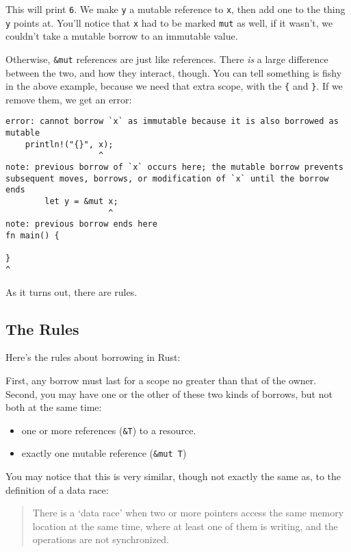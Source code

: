 \documentclass[a4paper,]{book}
\providecommand{\tightlist}{%
  \setlength{\itemsep}{0pt}\setlength{\parskip}{0pt}}
\begin{document}
This will print \texttt{6}. We make \texttt{y} a mutable reference to
\texttt{x}, then add one to the thing \texttt{y} points at. You'll
notice that \texttt{x} had to be marked \texttt{mut} as well, if it
wasn't, we couldn't take a mutable borrow to an immutable value.

Otherwise, \texttt{\&mut} references are just like references. There
\emph{is} a large difference between the two, and how they interact,
though. You can tell something is fishy in the above example, because we
need that extra scope, with the \texttt{\{} and \texttt{\}}. If we
remove them, we get an error:

\begin{verbatim}
error: cannot borrow `x` as immutable because it is also borrowed as mutable
    println!("{}", x);
                   ^
note: previous borrow of `x` occurs here; the mutable borrow prevents
subsequent moves, borrows, or modification of `x` until the borrow ends
        let y = &mut x;
                     ^
note: previous borrow ends here
fn main() {

}
^
\end{verbatim}

As it turns out, there are rules.

\subsection{The Rules}\label{the-rules}

Here's the rules about borrowing in Rust:

First, any borrow must last for a scope no greater than that of the
owner. Second, you may have one or the other of these two kinds of
borrows, but not both at the same time:

\begin{itemize}
\tightlist
\item
  one or more references (\texttt{\&T}) to a resource.
\item
  exactly one mutable reference (\texttt{\&mut\ T})
\end{itemize}

You may notice that this is very similar, though not exactly the same
as, to the definition of a data race:

\begin{quote}
There is a `data race' when two or more pointers access the same memory
location at the same time, where at least one of them is writing, and
the operations are not synchronized.
\end{quote}
\end{document}
